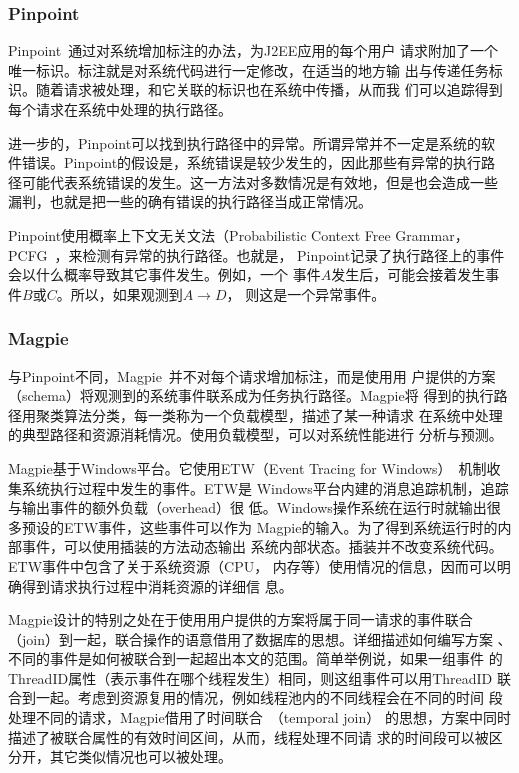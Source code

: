 
\subsubsection*{Pinpoint}


Pinpoint~\cite{pinpoint}通过对系统增加标注的办法，为J2EE应用的每个用户
请求附加了一个唯一标识。标注就是对系统代码进行一定修改，在适当的地方输
出与传递任务标识。随着请求被处理，和它关联的标识也在系统中传播，从而我
们可以追踪得到每个请求在系统中处理的执行路径。

进一步的，Pinpoint可以找到执行路径中的异常。所谓异常并不一定是系统的软
件错误。Pinpoint的假设是，系统错误是较少发生的，因此那些有异常的执行路
径可能代表系统错误的发生。这一方法对多数情况是有效地，但是也会造成一些
漏判，也就是把一些的确有错误的执行路径当成正常情况。

Pinpoint使用概率上下文无关文法（Probabilistic Context Free
Grammar，PCFG~\cite{Manning1999}，来检测有异常的执行路径。也就是，
Pinpoint记录了执行路径上的事件会以什么概率导致其它事件发生。例如，一个
事件$A$发生后，可能会接着发生事件$B$或$C$。所以，如果观测到$A \to D$，
则这是一个异常事件。

\subsubsection*{Magpie}

与Pinpoint不同，Magpie~\cite{magpie}并不对每个请求增加标注，而是使用用
户提供的方案（schema）将观测到的系统事件联系成为任务执行路径。Magpie将
得到的执行路径用聚类算法分类，每一类称为一个负载模型，描述了某一种请求
在系统中处理的典型路径和资源消耗情况。使用负载模型，可以对系统性能进行
分析与预测。

Magpie基于Windows平台。它使用ETW（Event Tracing for
Windows）~\cite{etw, Park2003}机制收集系统执行过程中发生的事件。ETW是
Windows平台内建的消息追踪机制，追踪与输出事件的额外负载（overhead）很
低。Windows操作系统在运行时就输出很多预设的ETW事件，这些事件可以作为
Magpie的输入。为了得到系统运行时的内部事件，可以使用插装的方法动态输出
系统内部状态。插装并不改变系统代码。ETW事件中包含了关于系统资源（CPU，
内存等）使用情况的信息，因而可以明确得到请求执行过程中消耗资源的详细信
息。

Magpie设计的特别之处在于使用用户提供的方案将属于同一请求的事件联合
（join）到一起，联合操作的语意借用了数据库的思想。详细描述如何编写方案
、不同的事件是如何被联合到一起超出本文的范围。简单举例说，如果一组事件
的ThreadID属性（表示事件在哪个线程发生）相同，则这组事件可以用ThreadID
联合到一起。考虑到资源复用的情况，例如线程池内的不同线程会在不同的时间
段处理不同的请求，Magpie借用了时间联合~\cite{Gao2005}（temporal join）
的思想，方案中同时描述了被联合属性的有效时间区间，从而，线程处理不同请
求的时间段可以被区分开，其它类似情况也可以被处理。

